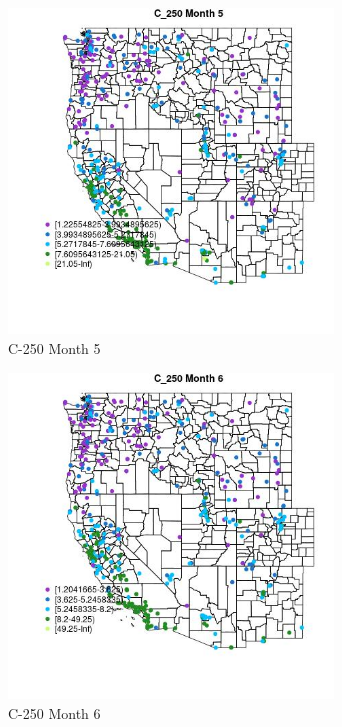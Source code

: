 \begin{figure} 
\centering  
\includegraphics[width=0.77\textwidth]{Code_Outputs/ML_input_report_ML_input_PM25_Step5_part_d_de_duplicated_aves_ML_input_MapObsMo5C_250.jpg} 
\caption{\label{fig:ML_input_report_ML_input_PM25_Step5_part_d_de_duplicated_aves_ML_inputMapObsMo5C_250}C-250 Month 5} 
\end{figure} 
 

\begin{figure} 
\centering  
\includegraphics[width=0.77\textwidth]{Code_Outputs/ML_input_report_ML_input_PM25_Step5_part_d_de_duplicated_aves_ML_input_MapObsMo6C_250.jpg} 
\caption{\label{fig:ML_input_report_ML_input_PM25_Step5_part_d_de_duplicated_aves_ML_inputMapObsMo6C_250}C-250 Month 6} 
\end{figure} 
 


